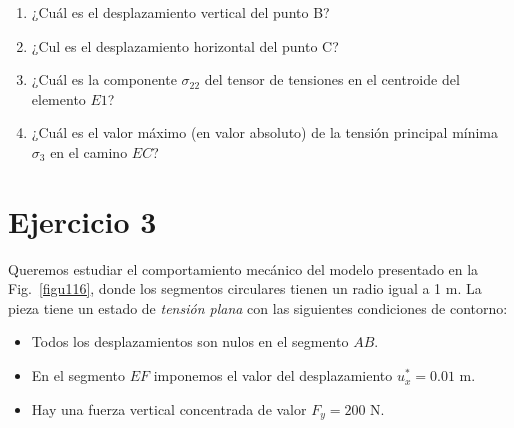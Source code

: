 \documentclass[a4paper,12pt]{article}
\begin{document}
\begin{enumerate}
\item ¿Cuál es el desplazamiento vertical del punto B?
\begin{multicols}{4}
\columnbreak
{} %
\columnbreak
{}
\columnbreak
{}
\end{multicols}
\item ¿Cul es el desplazamiento horizontal del punto C?
\begin{multicols}{4}
\columnbreak
{} %
\columnbreak
{}
\columnbreak
{}
\end{multicols}
\item ¿Cuál es la componente $\sigma_{22}$ del tensor de tensiones en el 
centroide del elemento $E1$?
\begin{multicols}{4}
\columnbreak
{}
\columnbreak
{}
\columnbreak
{} %
\end{multicols}
\item ¿Cuál es el valor máximo (en valor absoluto) de la tensión principal
mínima $\sigma_3$ en el camino $EC$?
\begin{multicols}{4}
\columnbreak
{}
\columnbreak
{}
\columnbreak
{}%
\end{multicols}
\end{enumerate}

\newpage

\section{Ejercicio  3}

Queremos estudiar el comportamiento mecánico del modelo presentado en la Fig.~\ref{figu116}, donde los segmentos circulares tienen un radio igual a 1 m. La pieza tiene un estado de \textit{tensión plana} con las siguientes condiciones de contorno:
\begin{itemize}
\item Todos los desplazamientos son nulos en el segmento $AB$.
\item En el segmento $EF$ imponemos el valor del desplazamiento $u_x^*=0.01$ m.
\item Hay una fuerza vertical concentrada de valor $F_y=200$ N.
\end{itemize}
\end{document}
